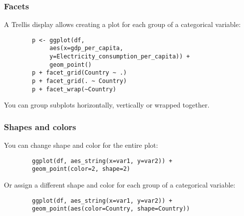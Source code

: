 \documentclass{beamer}
\begin{document}
	\begin{frame}[fragile]
		\frametitle{Facets}

		A Trellis display allows creating a plot for each group of a categorical variable:

		\vspace{2em}

		\begin{exampleblock}{}
		\begin{BVerbatim}
		p <- ggplot(df,
		     aes(x=gdp_per_capita,
		     y=Electricity_consumption_per_capita)) +
		     geom_point()
		p + facet_grid(Country ~ .)
		p + facet_grid(. ~ Country)
		p + facet_wrap(~Country)
		\end{BVerbatim}
		\end{exampleblock}{}

		\vspace{2em}

		You can group subplots horizontally, vertically or wrapped together.

	\end{frame}

	\begin{frame}[fragile]
		\frametitle{Shapes and colors}

		You can change shape and color for the entire plot:

		\vspace{2em}

		\begin{exampleblock}{}
		\begin{BVerbatim}
		ggplot(df, aes_string(x=var1, y=var2)) +
		geom_point(color=2, shape=2)
		\end{BVerbatim}
		\end{exampleblock}{}

		\vspace{2em}

		Or assign a different shape and color for each group of a categorical variable:

		\vspace{2em}

		\begin{exampleblock}{}
		\begin{BVerbatim}
		ggplot(df, aes_string(x=var1, y=var2)) +
		geom_point(aes(color=Country, shape=Country))
		\end{BVerbatim}
		\end{exampleblock}{}

	\end{frame}
\end{document}
